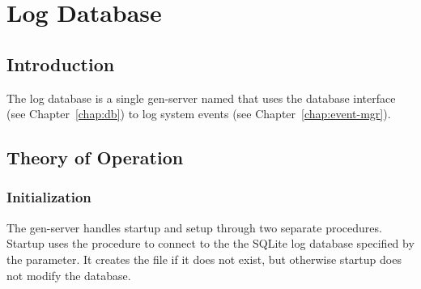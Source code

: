 %
%
%

\chapter {Log Database}\label{chap:log-db}

\section {Introduction}

The log database is a single gen-server named  that
uses the database interface (see Chapter~\ref{chap:db}) to log system
events (see Chapter~\ref{chap:event-mgr}).

\section {Theory of Operation}

\subsection {Initialization}

The  gen-server handles startup and setup through two
separate procedures. Startup uses the 
procedure to connect to the the SQLite log database specified by the
 parameter. It creates the file if it does not
exist, but otherwise startup does not modify the database.

